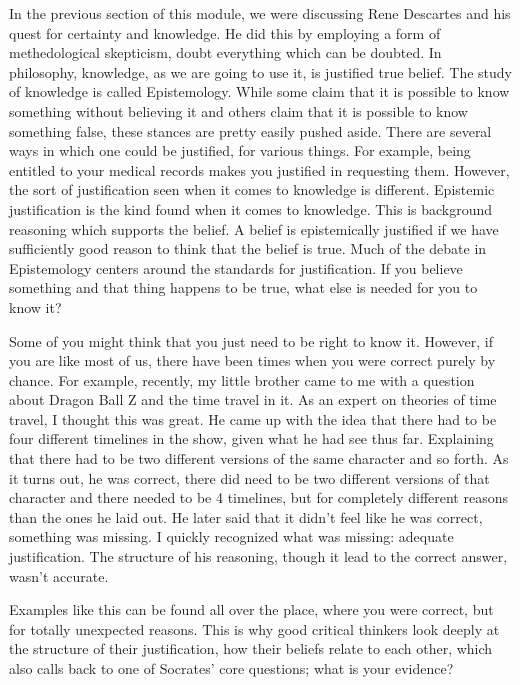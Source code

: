 In the previous section of this module, we were discussing Rene Descartes and his quest for certainty and knowledge. He did this by employing a form of methedological skepticism, doubt everything which can be doubted. In philosophy, knowledge, as we are going to use it, is justified true belief. The study of knowledge is called Epistemology. While some claim that it is possible to know something without believing it and others claim that it is possible to know something false, these stances are pretty easily pushed aside. There are several ways in which one could be justified, for various things. For example, being entitled to your medical records makes you justified in requesting them. However, the sort of justification seen when it comes to knowledge is different. Epistemic justification is the kind found when it comes to knowledge. This is background reasoning which supports the belief. A belief is epistemically justified if we have sufficiently good reason to think that the belief is true. Much of the debate in Epistemology centers around the standards for justification. If you believe something and that thing happens to be true, what else is needed for you to know it?

Some of you might think that you just need to be right to know it. However, if you are like most of us, there have been times when you were correct purely by chance. For example, recently, my little brother came to me with a question about Dragon Ball Z and the time travel in it. As an expert on theories of time travel, I thought this was great. He came up with the idea that there had to be four different timelines in the show, given what he had see thus far. Explaining that there had to be two different versions of the same character and so forth. As it turns out, he was correct, there did need to be two different versions of that character and there needed to be 4 timelines, but for completely different reasons than the ones he laid out. He later said that it didn't feel like he was correct, something was missing. I quickly recognized what was missing: adequate justification. The structure of his reasoning, though it lead to the correct answer, wasn't accurate.

Examples like this can be found all over the place, where you were correct, but for totally unexpected reasons. This is why good critical thinkers look deeply at the structure of their justification, how their beliefs relate to each other, which also calls back to one of Socrates' core questions; what is your evidence?

